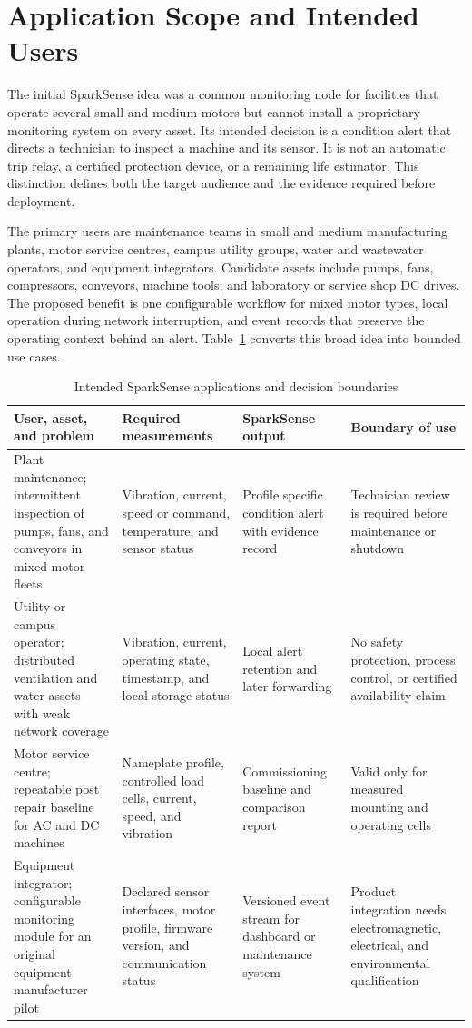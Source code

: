\documentclass[10pt,twocolumn]{article}
\begin{document}
\section{Application Scope and Intended Users}
The initial SparkSense idea was a common monitoring node for facilities that operate several small and medium motors but cannot install a proprietary monitoring system on every asset. Its intended decision is a condition alert that directs a technician to inspect a machine and its sensor. It is not an automatic trip relay, a certified protection device, or a remaining life estimator. This distinction defines both the target audience and the evidence required before deployment.

The primary users are maintenance teams in small and medium manufacturing plants, motor service centres, campus utility groups, water and wastewater operators, and equipment integrators. Candidate assets include pumps, fans, compressors, conveyors, machine tools, and laboratory or service shop DC drives. The proposed benefit is one configurable workflow for mixed motor types, local operation during network interruption, and event records that preserve the operating context behind an alert. Table~\ref{tab:applications} converts this broad idea into bounded use cases.

\begin{table}[t]
\caption{Intended SparkSense applications and decision boundaries}
\label{tab:applications}
\centering
\footnotesize
\begin{tabularx}{0.96\textwidth}{@{}p{}p{}p{}X@{}}
\toprule
User, asset, and problem & Required measurements & SparkSense output & Boundary of use \\
\midrule
Plant maintenance; intermittent inspection of pumps, fans, and conveyors in mixed motor fleets & Vibration, current, speed or command, temperature, and sensor status & Profile specific condition alert with evidence record & Technician review is required before maintenance or shutdown \\
Utility or campus operator; distributed ventilation and water assets with weak network coverage & Vibration, current, operating state, timestamp, and local storage status & Local alert retention and later forwarding & No safety protection, process control, or certified availability claim \\
Motor service centre; repeatable post repair baseline for AC and DC machines & Nameplate profile, controlled load cells, current, speed, and vibration & Commissioning baseline and comparison report & Valid only for measured mounting and operating cells \\
Equipment integrator; configurable monitoring module for an original equipment manufacturer pilot & Declared sensor interfaces, motor profile, firmware version, and communication status & Versioned event stream for dashboard or maintenance system & Product integration needs electromagnetic, electrical, and environmental qualification \\
\bottomrule
\end{tabularx}
\end{table}
\end{document}
